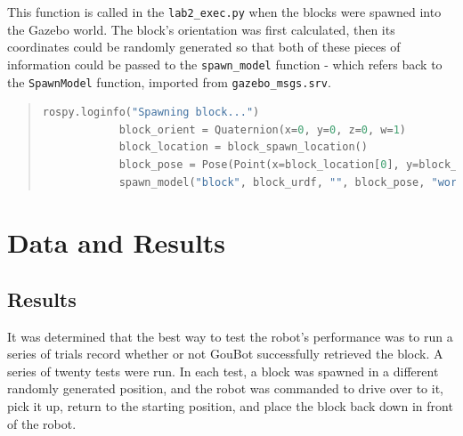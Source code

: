         This function is called in the \lstinline!lab2_exec.py! when the blocks were spawned into the Gazebo world. The block's orientation was first calculated, then its coordinates could be randomly generated so that both of these pieces of information could be passed to the \lstinline!spawn_model! function - which refers back to the \lstinline!SpawnModel! function, imported from \lstinline!gazebo_msgs.srv!.
        
        \begin{quote}
            \begin{lstlisting}[gobble=12,language=python]
            rospy.loginfo("Spawning block...")
            block_orient = Quaternion(x=0, y=0, z=0, w=1)
            block_location = block_spawn_location()
            block_pose = Pose(Point(x=block_location[0], y=block_location[1], z=0.0159), block_orient)
            spawn_model("block", block_urdf, "", block_pose, "world")
            \end{lstlisting}
        \end{quote}

\newpage
\section{Data and Results} \label{sec:data_results}
    
    
    \subsection{Results}
    
        It was determined that the best way to test the robot's performance was to run a series of trials record whether or not GouBot successfully retrieved the block. A series of twenty tests were run. In each test, a block was spawned in a different randomly generated position, and the robot was commanded to drive over to it, pick it up, return to the starting position, and place the block back down in front of the robot. 
        
